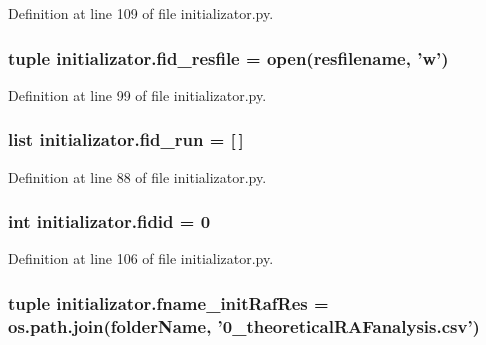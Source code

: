 Definition at line 109 of file initializator.\-py.

\hypertarget{a00104_aec4081e394ea2eebcedadf723268f970}{
\subsubsection[{fid\-\_\-resfile}]{\setlength{\rightskip}{0pt plus 5cm}tuple initializator.\-fid\-\_\-resfile = open({\bf resfilename}, 'w')}}\label{a00104_aec4081e394ea2eebcedadf723268f970}


Definition at line 99 of file initializator.\-py.

\hypertarget{a00104_a6015a676cc06fdae98b1cca15d92b883}{
\subsubsection[{fid\-\_\-run}]{\setlength{\rightskip}{0pt plus 5cm}list initializator.\-fid\-\_\-run = \mbox{[}$\,$\mbox{]}}}\label{a00104_a6015a676cc06fdae98b1cca15d92b883}


Definition at line 88 of file initializator.\-py.

\hypertarget{a00104_afdd976dc87dc056c8cba6926f9f98287}{
\subsubsection[{fidid}]{\setlength{\rightskip}{0pt plus 5cm}int initializator.\-fidid = 0}}\label{a00104_afdd976dc87dc056c8cba6926f9f98287}


Definition at line 106 of file initializator.\-py.

\hypertarget{a00104_a139a15a6b4127dd23049cb2b91a85d77}{
\subsubsection[{fname\-\_\-init\-Raf\-Res}]{\setlength{\rightskip}{0pt plus 5cm}tuple initializator.\-fname\-\_\-init\-Raf\-Res = os.\-path.\-join({\bf folder\-Name}, '0\-\_\-theoretical\-R\-A\-Fanalysis.\-csv')}}\label{a00104_a139a15a6b4127dd23049cb2b91a85d77}


